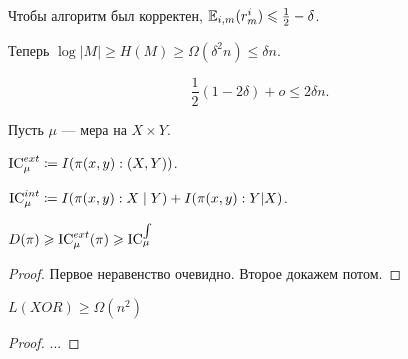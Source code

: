 Чтобы алгоритм был корректен, $ \mathbb{E}_{i, m} (r_m^{i}) \leqslant \frac{1}{2} - \delta $.

Теперь $ \log \lvert M \rvert  \ge H(M) \ge \Omega ( \delta ^2 n) \le  \delta n$.

\[
	\frac{1}{2} (1 - 2\delta )  + o \le 2\delta  n
.\] 

\dotfill

\begin{defn}
Пусть $  \mu$ --- мера на $ X \times Y$. 

$ \operatorname{IC}_{\mu}^{ext} \coloneqq I( \pi(x, y): (X, Y))$.

$ \operatorname{IC}_{\mu}^{int} \coloneqq I( \pi(x, y) : X \mid Y) + I( \pi(x, y) : Y | X) $.
\end{defn}

\begin{thm}
	$ D( \pi) \geqslant  \operatorname{IC}_{\mu}^{ext}( \pi) \geqslant \operatorname{IC}_{ \mu}^{\int}$
\end{thm}
\begin{proof}
    Первое неравенство очевидно. Второе докажем потом.
\end{proof}
\begin{thm}[Храпченко]
	$ L( XOR) \ge \Omega (n^2)$
\end{thm}
\begin{proof}
   ... 
\end{proof}
